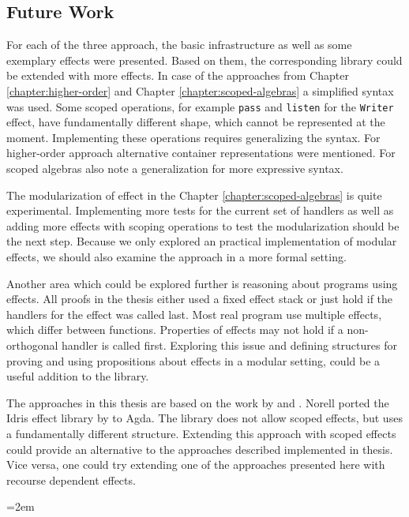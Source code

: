 \documentclass[10pt,a4paper,twoside,notitlepage]{report}
\begin{document}
\subsection{Future Work}

For each of the three approach, the basic infrastructure as well as some
exemplary effects were presented.
Based on them, the corresponding library could be extended with more effects.
In case of the approaches from Chapter \ref{chapter:higher-order} and Chapter
\ref{chapter:scoped-algebras} a simplified syntax was used.
Some scoped operations, for example \texttt{pass} and \texttt{listen} for the
\texttt{Writer} effect, have fundamentally different shape, which cannot be
represented at the moment.
Implementing these operations requires generalizing the syntax.
For higher-order approach alternative container representations were mentioned.
For scoped algebras \textcite{DBLP:conf/lics/PirogSWJ18} also note a
generalization for more expressive syntax.

The modularization of effect in the Chapter \ref{chapter:scoped-algebras} is
quite experimental.
Implementing more tests for the current set of handlers as well as adding more
effects with scoping operations to test the modularization should be the next
step.
Because we only explored an practical implementation of modular effects, we
should also examine the approach in a more formal setting.

Another area which could be explored further is reasoning about programs using
effects.
All proofs in the thesis either used a fixed effect stack or just hold if the
handlers for the effect was called last.
Most real program use multiple effects, which differ between functions.
Properties of effects may not hold if a non-orthogonal handler is called first.
Exploring this issue and defining structures for proving and using propositions
about effects in a modular setting, could be a useful addition to the library.

The approaches in this thesis are based on the work by
\textcite{DBLP:conf/haskell/WuSH14} and \textcite{DBLP:conf/lics/PirogSWJ18}.
Norell ported the Idris effect library by \textcite{DBLP:conf/icfp/Brady13} to
Agda.
The library does not allow scoped effects, but uses a fundamentally different
structure.
Extending this approach with scoped effects could provide an alternative to the
approaches described implemented in thesis.
Vice versa, one could try extending one of the approaches presented here with
recourse dependent effects.

\emergencystretch=2em
\printbibliography
\end{document}
